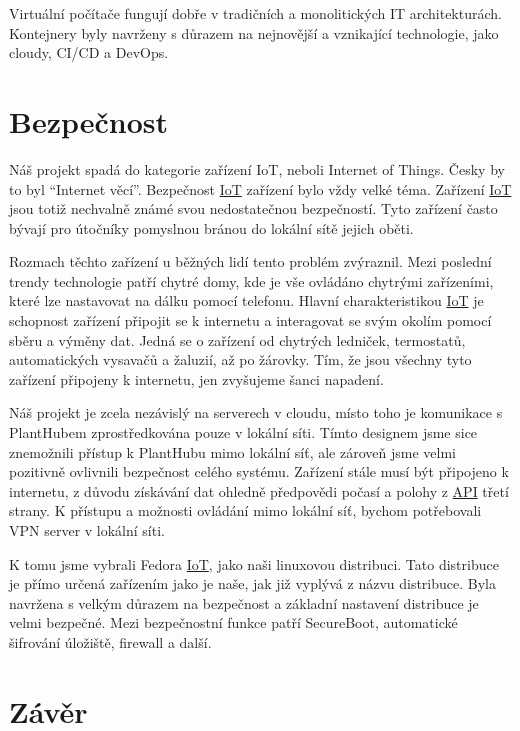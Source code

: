 \documentclass[czech,12pt,a4paper]{article}
\begin{document}
Virtuální počítače fungují dobře v tradičních a monolitických IT architekturách. Kontejnery byly navrženy s důrazem na nejnovější a vznikající technologie, jako cloudy, CI/CD a DevOps.

\clearpage

\section{Bezpečnost} \label{secBezpecnost}

Náš projekt spadá do kategorie zařízení \ac{IoT}, neboli Internet of Things. Česky by to byl \enquote{Internet věcí}. Bezpečnost \underline{\ac{IoT}} zařízení bylo vždy velké téma. Zařízení \underline{\ac{IoT}} jsou totiž nechvalně známé svou nedostatečnou bezpečností. Tyto zařízení často bývají pro útočníky pomyslnou bránou do lokální sítě jejich oběti.

Rozmach těchto zařízení u běžných lidí tento problém zvýraznil. Mezi poslední trendy technologie patří chytré domy, kde je vše ovládáno chytrými zařízeními, které lze nastavovat na dálku pomocí telefonu. Hlavní charakteristikou \underline{\ac{IoT}} je schopnost zařízení připojit se k internetu a interagovat se svým okolím pomocí sběru a výměny dat. Jedná se o zařízení od chytrých ledniček, termostatů, automatických vysavačů a žaluzií, až po žárovky. Tím, že jsou všechny tyto zařízení připojeny k internetu, jen zvyšujeme šanci napadení.

Náš projekt je zcela nezávislý na serverech v cloudu, místo toho je komunikace s PlantHubem zprostředkována pouze v lokální síti. Tímto designem jsme sice znemožnili přístup k PlantHubu mimo lokální síť, ale zároveň jsme velmi pozitivně ovlivnili bezpečnost celého systému. Zařízení stále musí být připojeno k internetu, z důvodu získávání dat ohledně předpovědi počasí a polohy z \underline{\ac{API}} třetí strany. K přístupu a možnosti ovládání mimo lokální síť, bychom potřebovali VPN server v lokální síti.

K tomu jsme vybrali Fedora \underline{\ac{IoT}}, jako naši linuxovou distribuci. Tato distribuce je přímo určená zařízením jako je naše, jak již vyplývá z názvu distribuce. Byla navržena s velkým důrazem na bezpečnost a základní nastavení distribuce je velmi bezpečné. Mezi bezpečnostní funkce patří SecureBoot, automatické šifrování úložiště, firewall a další.

\clearpage

\section{Závěr} \label{secZaver}
\end{document}
